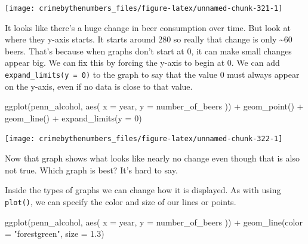 \documentclass[
  a4paper,
]{krantz}
\makeatletter
\newenvironment{Shaded}{\begin{snugshade}}{\end{snugshade}}
\newcommand{\AttributeTok}[1]{\textcolor[rgb]{0.77,0.63,0.00}{#1}}
\newcommand{\DecValTok}[1]{\textcolor[rgb]{0.00,0.00,0.81}{#1}}
\newcommand{\FloatTok}[1]{\textcolor[rgb]{0.00,0.00,0.81}{#1}}
\newcommand{\FunctionTok}[1]{\textcolor[rgb]{0.00,0.00,0.00}{#1}}
\newcommand{\NormalTok}[1]{#1}
\newcommand{\SpecialCharTok}[1]{\textcolor[rgb]{0.00,0.00,0.00}{#1}}
\newcommand{\StringTok}[1]{\textcolor[rgb]{0.31,0.60,0.02}{#1}}
\newenvironment{kframe}{%
\medskip{}
\setlength{\fboxsep}{.8em}
 \def\at@end@of@kframe{}%
 \ifinner\ifhmode%
  \def\at@end@of@kframe{\end{minipage}}%
  \begin{minipage}{\columnwidth}%
 \fi\fi%
 \def\FrameCommand##1{\hskip\@totalleftmargin \hskip-\fboxsep
 \colorbox{shadecolor}{##1}\hskip-\fboxsep
     \hskip-\linewidth \hskip-\@totalleftmargin \hskip\columnwidth}%
 \MakeFramed {\advance\hsize-\width
   \@totalleftmargin\z@ \linewidth\hsize
   \@setminipage}}%
 {\par\unskip\endMakeFramed%
 \at@end@of@kframe}
\renewenvironment{Shaded}{\begin{kframe}}{\end{kframe}}
\makeatother
\begin{document}
\begin{center}\texttt{[image: crimebythenumbers\_files/figure-latex/unnamed-chunk-321-1]} \end{center}

It looks like there's a huge change in beer consumption over
time. But look at where they y-axis starts. It starts around
280 so really that change is only \textasciitilde60 beers.
That's because when graphs don't start at 0, it can make
small changes appear big. We can fix this by forcing the
y-axis to begin at 0. We can add
\texttt{expand\_limits(y\ =\ 0)} to the graph to say that
the value 0 must always appear on the y-axis, even if no
data is close to that value.

\begin{Shaded}
\begin{Highlighting}[]
\FunctionTok{ggplot}\NormalTok{(penn\_alcohol, }\FunctionTok{aes}\NormalTok{(}
  \AttributeTok{x =}\NormalTok{ year,}
  \AttributeTok{y =}\NormalTok{ number\_of\_beers}
\NormalTok{)) }\SpecialCharTok{+}
  \FunctionTok{geom\_point}\NormalTok{() }\SpecialCharTok{+}
  \FunctionTok{geom\_line}\NormalTok{() }\SpecialCharTok{+}
  \FunctionTok{expand\_limits}\NormalTok{(}\AttributeTok{y =} \DecValTok{0}\NormalTok{)}
\end{Highlighting}
\end{Shaded}

\begin{center}\texttt{[image: crimebythenumbers\_files/figure-latex/unnamed-chunk-322-1]} \end{center}

Now that graph shows what looks like nearly no change even
though that is also not true. Which graph is best? It's hard
to say.

Inside the types of graphs we can change how it is
displayed. As with using \texttt{plot()}, we can specify the
color and size of our lines or points.

\begin{Shaded}
\begin{Highlighting}[]
\FunctionTok{ggplot}\NormalTok{(penn\_alcohol, }\FunctionTok{aes}\NormalTok{(}
  \AttributeTok{x =}\NormalTok{ year,}
  \AttributeTok{y =}\NormalTok{ number\_of\_beers}
\NormalTok{)) }\SpecialCharTok{+}
  \FunctionTok{geom\_line}\NormalTok{(}\AttributeTok{color =} \StringTok{"forestgreen"}\NormalTok{, }\AttributeTok{size =} \FloatTok{1.3}\NormalTok{)}
\end{Highlighting}
\end{Shaded}
\end{document}
